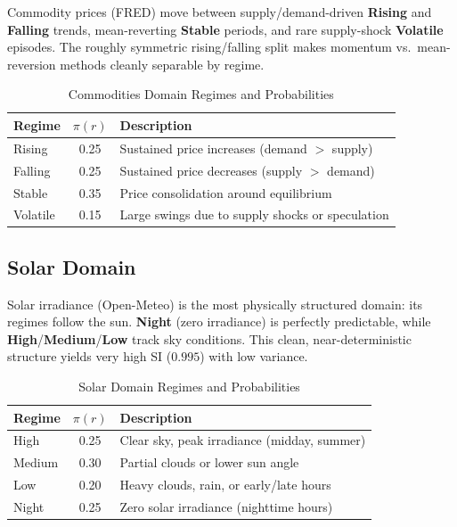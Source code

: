 \documentclass[11pt,a4paper]{article}
\theoremstyle{definition}
\theoremstyle{plain}
\begin{document}
Commodity prices (FRED) move between supply/demand-driven \textbf{Rising} and
\textbf{Falling} trends, mean-reverting \textbf{Stable} periods, and rare
supply-shock \textbf{Volatile} episodes. The roughly symmetric rising/falling
split makes momentum vs.\ mean-reversion methods cleanly separable by regime.

\begin{table}[H]
\centering
\caption{Commodities Domain Regimes and Probabilities}
\begin{tabular}{lcp{8cm}}
\toprule
Regime & $\pi(r)$ & Description \\
\midrule
Rising & 0.25 & Sustained price increases (demand $>$ supply) \\
Falling & 0.25 & Sustained price decreases (supply $>$ demand) \\
Stable & 0.35 & Price consolidation around equilibrium \\
Volatile & 0.15 & Large swings due to supply shocks or speculation \\
\bottomrule
\end{tabular}
\end{table}

\subsection{Solar Domain}

Solar irradiance (Open-Meteo) is the most physically structured domain: its
regimes follow the sun. \textbf{Night} (zero irradiance) is perfectly predictable,
while \textbf{High}/\textbf{Medium}/\textbf{Low} track sky conditions. This clean,
near-deterministic structure yields very high SI ($0.995$) with low variance.

\begin{table}[H]
\centering
\caption{Solar Domain Regimes and Probabilities}
\begin{tabular}{lcp{8cm}}
\toprule
Regime & $\pi(r)$ & Description \\
\midrule
High & 0.25 & Clear sky, peak irradiance (midday, summer) \\
Medium & 0.30 & Partial clouds or lower sun angle \\
Low & 0.20 & Heavy clouds, rain, or early/late hours \\
Night & 0.25 & Zero solar irradiance (nighttime hours) \\
\bottomrule
\end{tabular}
\end{table}
\end{document}
